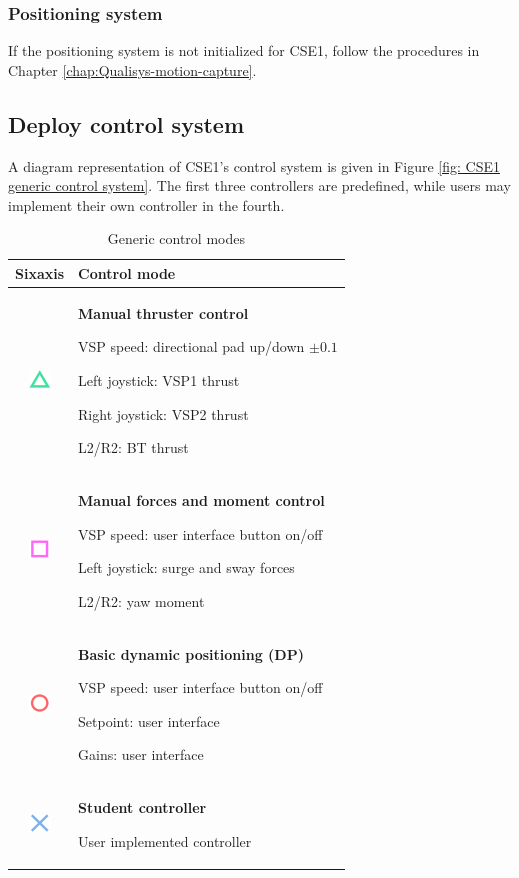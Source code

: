 \documentclass[a4paper,twoside,english]{report}
\providecommand{\tabularnewline}{\\}
\begin{document}
\subsubsection{Positioning system}

If the positioning system is not initialized for CSE1, follow the
procedures in Chapter \ref{chap:Qualisys-motion-capture}.

\clearpage{}

\subsection{Deploy control system}


A diagram representation of CSE1's control system is given in Figure
\ref{fig: CSE1 generic control system}. The first three controllers
are predefined, while users may implement their own controller in
the fourth.

\begin{table}
\centering{}%
\begin{tabular}{c>{\raggedright}p{6.5cm}}
\hline 
Sixaxis & Control mode\tabularnewline
\hline 
\includegraphics[scale=0.4]{fig/sixaxis_triangle} & \textbf{Manual thruster control}

VSP speed: directional pad up/down $\pm0.1$

Left joystick: VSP1 thrust

Right joystick: VSP2 thrust

L2/R2: BT thrust\tabularnewline
\hline 
\includegraphics[scale=0.4]{fig/sixaxis_square} & \textbf{Manual forces and moment control}

VSP speed: user interface button on/off

Left joystick: surge and sway forces

L2/R2: yaw moment\tabularnewline
\hline 
\includegraphics[scale=0.4]{fig/sixaxis_circle} & \textbf{Basic dynamic positioning (DP)}

VSP speed: user interface button on/off

Setpoint: user interface

Gains: user interface\tabularnewline
\hline 
\includegraphics[scale=0.4]{fig/sixaxis_cross} & \textbf{Student controller}

User implemented controller\tabularnewline
\hline 
\end{tabular}\caption{\label{tab: CSE1 control system modes}Generic control modes}
\end{table}
\end{document}
